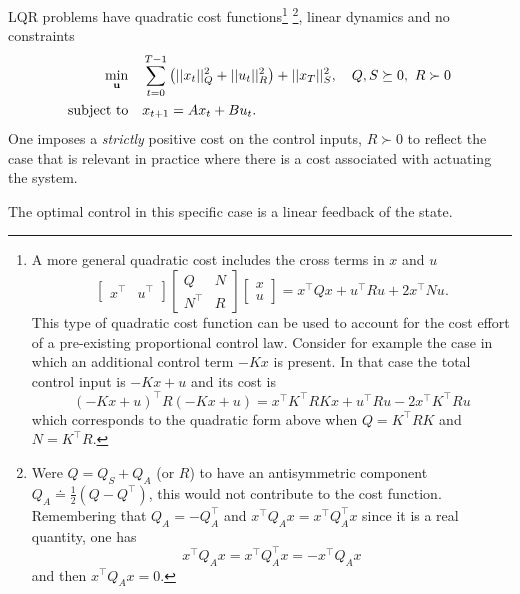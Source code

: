 LQR problems have quadratic cost functions\footnote{A more general quadratic cost includes the cross terms in $x$ and $u$
\begin{equation*}
  \begin{bmatrix}
    x^\top & u^\top
  \end{bmatrix}
  \begin{bmatrix}
    Q & N \\ N^\top & R
  \end{bmatrix}
  \begin{bmatrix}
    x \\ u
  \end{bmatrix} = x^\top Qx + u^\top Ru + 2x^\top N u.
\end{equation*}
This type of quadratic cost function can be used to account for the cost effort of a pre-existing proportional control law.
Consider for example the case in which an additional control term $-Kx$ is present. In that case the total control input is $-Kx + u$ and its cost is
\begin{equation*}
  (-Kx + u)^\top R (-Kx + u) = x^\top K^\top R K  x + u^\top R u - 2 x^\top K^\top R u
\end{equation*}
which corresponds to the quadratic form above when $Q=K^\top R K$ and $N = K^\top R$.}%
\footnote{Were $Q = Q_S+Q_A$ (or $R$) to have an antisymmetric component $Q_A\doteq\tfrac{1}{2}\left(Q-Q^\top\right)$, this would not contribute to the cost function. Remembering that $Q_A=-Q_A^\top$ and $x^\top Q_Ax = x^\top Q_A^\top x$ since it is a real quantity, one has
\begin{equation*}
  x^\top Q_Ax = x^\top Q_A^\top x = -x^\top Q_Ax
\end{equation*}
and then $x^\top Q_Ax=0$.}, linear dynamics and no constraints
\begin{equation}
  \label{eq:LQR-formulation}
  \begin{aligned}
    \min_{\boldsymbol{\mathrm{u}}} \quad & \sum_{t=0}^{T-1} \left(||x_t||_Q^2 + ||u_t||_R^2\right) + ||x_T||_S^2,\quad Q,S \succeq 0,\ R \succ 0 \\
    \text{subject to} \quad & x_{t+1} = Ax_t + Bu_t.
  \end{aligned}
\end{equation}
One imposes a \emph{strictly} positive cost on the control inputs, $R\succ 0$ to reflect the case that is relevant in practice where there is a cost associated with actuating the system.

The optimal control in this specific case is a linear feedback of the state.

